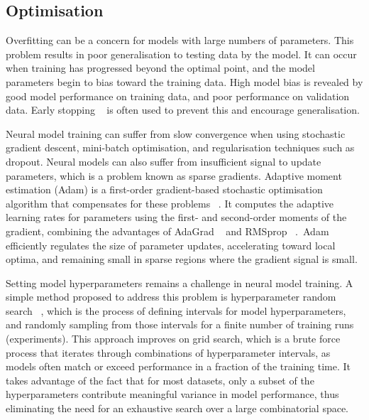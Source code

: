 \subsection{Optimisation} 

Overfitting can be a concern for models with large numbers of parameters. This problem results in poor generalisation to testing data by the model. It can occur when training has progressed beyond the optimal point, and the model parameters begin to bias toward the training data. High model bias is revealed by good model performance on training data, and poor performance on validation data. Early stopping \unskip~\citep{prechelt1998early} is often used to prevent this and encourage generalisation. \par

\noindent Neural model training can suffer from slow convergence when using stochastic gradient descent, mini-batch optimisation, and regularisation techniques such as dropout. Neural models can also suffer from insufficient signal to update parameters, which is a problem known as sparse gradients. Adaptive moment estimation (Adam) is a first-order gradient-based stochastic optimisation algorithm that compensates for these problems \unskip ~\citep{kingma2014adam}. It computes the adaptive learning rates for parameters using the first- and second-order moments of the gradient, combining the advantages of AdaGrad \unskip ~\citep{duchi2011adaptive} and RMSprop \unskip ~\citep{tieleman2012lecture}.\ Adam efficiently regulates the size of parameter updates, accelerating toward local optima, and remaining small in sparse regions where the gradient signal is small. \par

\noindent Setting model hyperparameters remains a challenge in neural model training. A simple method proposed to address this problem is hyperparameter random search \unskip ~\citep{bergstra2012random}, which is the process of defining intervals for model hyperparameters, and randomly sampling from those intervals for a finite number of training runs (experiments). This approach improves on grid search, which is a brute force process that iterates through combinations of hyperparameter intervals, as models often match or exceed performance in a fraction of the training time. It takes advantage of the fact that for most datasets, only a subset of the hyperparameters contribute meaningful variance in model performance, thus eliminating the need for an exhaustive search over a large combinatorial space. \par

